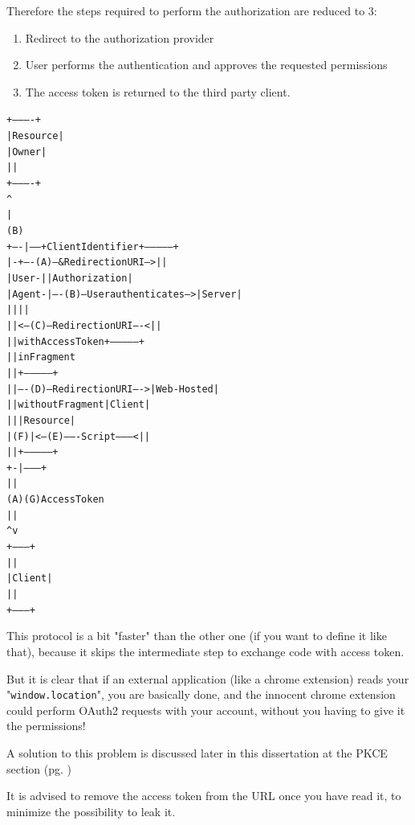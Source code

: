 \documentclass[11pt]{style}
\begin{document}
Therefore the steps required to perform the authorization are reduced to 3:
\begin{enumerate}
    \item Redirect to the authorization provider
    \item User performs the authentication and approves the requested
        permissions
    \item The access token is returned to the third party client.
\end{enumerate}

\begin{alltt}
     +----------+
     | Resource |
     |  Owner   |
     |          |
     +----------+
          ^
          |
         (B)
     +----|-----+          Client Identifier     +---------------+
     |         -+----(A)-- & Redirection URI --->|               |
     |  User-   |                                | Authorization |
     |  Agent  -|----(B)-- User authenticates -->|     Server    |
     |          |                                |               |
     |          |<---(C)--- Redirection URI ----<|               |
     |          |          with Access Token     +---------------+
     |          |            in Fragment
     |          |                                +---------------+
     |          |----(D)--- Redirection URI ---->|   Web-Hosted  |
     |          |          without Fragment      |     Client    |
     |          |                                |    Resource   |
     |     (F)  |<---(E)------- Script ---------<|               |
     |          |                                +---------------+
     +-|--------+
       |    |
      (A)  (G) Access Token
       |    |
       ^    v
     +---------+
     |         |
     |  Client |
     |         |
     +---------+
\end{alltt}


This protocol is a bit "faster" than the other one (if you want to define it
like that), because it skips the intermediate step to exchange code with access
token.

But it is clear that if an external application (like a chrome extension) reads
your "\texttt{window.location}", you are basically done, and the innocent chrome
extension could perform OAuth2 requests with your account, without you having to
give it the permissions!

A solution to this problem is discussed later in this dissertation at the PKCE
section (pg. \pageref{pkce})

It is advised to remove the access token from the URL once you have read it, to
minimize the possibility to leak it.
\end{document}
